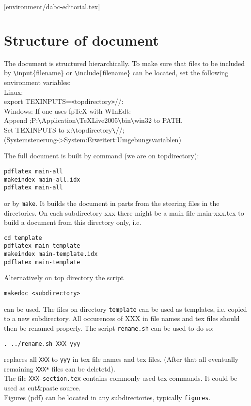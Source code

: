 [environment/dabc-editorial.tex]

\section{Structure of document}
The document is structured hierarchically. To make sure that files
to be included by \verb+\+input\{filename\} or \verb+\+include\{filename\}
can be located, set the following environment variables:\\
Linux:\\
export TEXINPUTS=\verb+<+topdirectory\verb+>+//:\\
Windows: If one uses fpTeX with WInEdt:\\
Append ;P:\verb+\+Application\verb+\+TeXLive2005\verb+\+bin\verb+\+win32 to PATH.\\
Set TEXINPUTS to x:\verb+\+topdirectory\verb+\+//;\\
(Systemsteuerung->System:Erweitert:Umgebungsvariablen)

The full document is built by command (we are on topdirectory):
\begin{verbatim}
pdflatex main-all
makeindex main-all.idx
pdflatex main-all
\end{verbatim}
or by {\tt make}. It builds the document in parts from the steering files in the directories.
On each subdirectory xxx there might be a main file main-xxx.tex to build a document 
from this directory only, i.e.
\begin{verbatim}
cd template
pdflatex main-template
makeindex main-template.idx
pdflatex main-template
\end{verbatim}
Alternatively on top directory the script 
\begin{verbatim}
makedoc <subdirectory>
\end{verbatim}
can be used. 
The files on directory {\tt template} can be used as templates, i.e. copied to a new subdirectory.
All occurences of XXX in file names and tex files should then be renamed properly.
The script {\tt rename.sh} can be used to do so:
\begin{verbatim}
. ../rename.sh XXX yyy
\end{verbatim}
replaces all {\tt XXX} to {\tt yyy} in tex file names and tex files.
(After that all eventually remaining {\tt *XXX*} files can be deletetd).\\
The file {\tt XXX-section.tex} contains commonly used tex commands.
It could be used as cut\&paste source.\\
Figures (pdf) can be located in any subdirectories, typically {\tt figures}.\\

